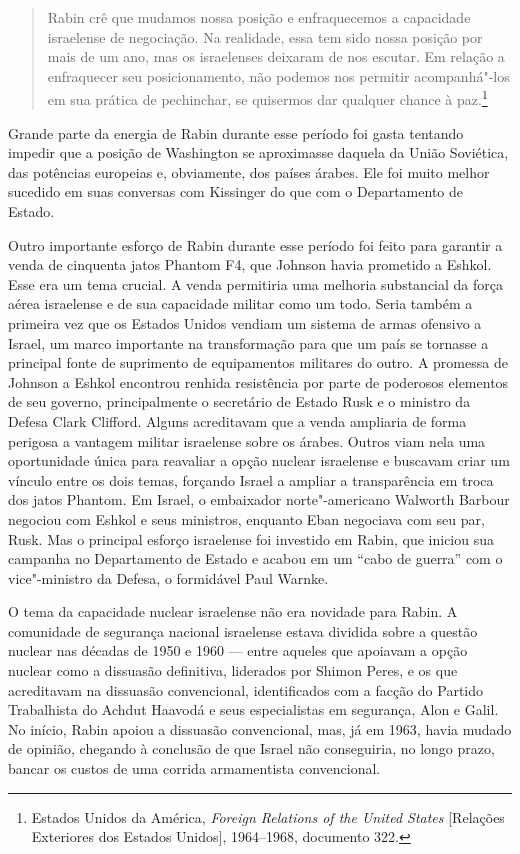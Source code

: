 \begin{quote}
Rabin crê que mudamos nossa posição e
enfraquecemos a capacidade israelense de negociação. Na realidade, essa
tem sido nossa posição por mais de um ano, mas os israelenses deixaram
de nos escutar. Em relação a enfraquecer seu posicionamento, não podemos nos
permitir acompanhá"-los em sua prática de pechinchar, se quisermos dar
qualquer chance à paz.\footnote{Estados Unidos da América, \textit{Foreign Relations of the United States} 
{[}Relações Exteriores dos Estados Unidos{]}, 1964--1968, documento 322.}
\end{quote}

Grande parte da energia de Rabin durante esse período foi gasta tentando
impedir que a posição de Washington se aproximasse daquela da União
Soviética, das potências europeias e, obviamente, dos países árabes. Ele
foi muito melhor sucedido em suas conversas com Kissinger do que com o
Departamento de Estado.

Outro importante esforço de Rabin durante esse período foi feito para
garantir a venda de cinquenta jatos Phantom F4, que Johnson havia
prometido a Eshkol. Esse era um tema crucial. A venda permitiria uma melhoria
substancial da força aérea israelense e de sua capacidade militar como
um todo. Seria também a primeira vez que os Estados Unidos vendiam um
sistema de armas ofensivo a Israel, um marco importante na transformação
para que um país se tornasse a principal fonte de suprimento de equipamentos militares do outro.
A promessa de Johnson a Eshkol encontrou renhida resistência por
parte de poderosos elementos de seu governo, principalmente o secretário
de Estado Rusk e o ministro da Defesa Clark Clifford. Alguns acreditavam
que a venda ampliaria de forma perigosa a vantagem militar israelense
sobre os árabes. Outros viam nela uma oportunidade única para reavaliar
a opção nuclear israelense e buscavam criar um vínculo entre os dois
temas, forçando Israel a ampliar a transparência em troca dos jatos
Phantom. Em Israel, o embaixador norte"-americano Walworth Barbour
negociou com Eshkol e seus ministros, enquanto Eban negociava com seu
par, Rusk. Mas o principal esforço israelense foi investido em Rabin,
que iniciou sua campanha no Departamento de Estado e acabou em um ``cabo
de guerra'' com o vice"-ministro da Defesa, o formidável Paul Warnke.

O tema da capacidade nuclear israelense não era novidade para
Rabin. A comunidade de segurança nacional israelense estava dividida
sobre a questão nuclear nas décadas de 1950 e 1960 --- entre aqueles que
apoiavam a opção nuclear como a dissuasão definitiva, liderados por
Shimon Peres, e os que acreditavam na dissuasão convencional,
identificados com a facção do Partido Trabalhista do Achdut Haavodá e
seus especialistas em segurança, Alon e Galil. No início, Rabin apoiou a
dissuasão convencional, mas, já em 1963, havia mudado de opinião, chegando
à conclusão de que Israel não conseguiria, no longo prazo, bancar os custos
de uma corrida armamentista convencional.

